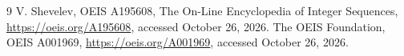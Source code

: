 \documentclass[10pt]{article}
\begin{document}
\begin{thebibliography}{9}
 V. Shevelev, OEIS A195608, The On-Line Encyclopedia
of Integer Sequences, \url{https://oeis.org/A195608}, accessed
October 26, 2026.
 The OEIS Foundation, OEIS A001969,
\url{https://oeis.org/A001969}, accessed October 26, 2026.
\end{thebibliography}
\end{document}
